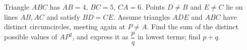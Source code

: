 Triangle $ABC$ has $AB=4$, $BC=5$, $CA=6$. Points $D\ne B$ and $E\ne C$ lie on lines $AB,AC$ and satisfy $BD=CE$. Assume triangles $ADE$ and $ABC$ have distinct circumcircles, meeting again at $P\ne A$. Find the sum of the distinct possible values of $AP^2$, and express it as $\dfrac{p}{q}$ in lowest terms; find $p+q$.
